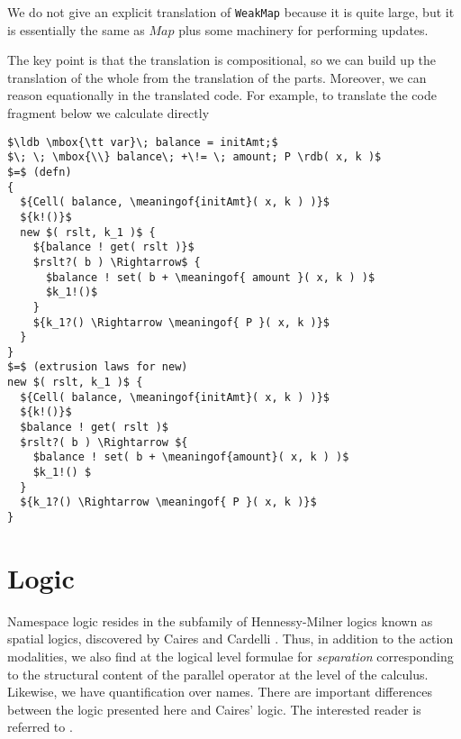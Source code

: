 \documentclass[]{acm_proc_article-sp}
\newcommand{\ldb}{[\![}
\newcommand{\rdb}{]\!]}
\newcommand{\meaningof}[1]{\ldb #1 \rdb}
\numberwithin{equation}{subsection}
\begin{document}
We do not give an explicit translation of {\tt WeakMap} because it is quite
large, but it is essentially the same as $Map$ plus some machinery for performing
updates.



The key point is that the translation is compositional, so we can
build up the translation of the whole from the translation of the
parts. Moreover, we can reason equationally in the translated
code. For example, to translate the code fragment below we calculate
directly


\begin{lstlisting}[mathescape]
$\ldb \mbox{\tt var}\; balance = initAmt;$
$\; \; \mbox{\\} balance\; +\!= \; amount; P \rdb( x, k )$
$=$ (defn)
{ 
  ${Cell( balance, \meaningof{initAmt}( x, k ) )}$
  ${k!()}$
  new $( rslt, k_1 )$ { 
    ${balance ! get( rslt )}$
    $rslt?( b ) \Rightarrow$ {
      $balance ! set( b + \meaningof{ amount }( x, k ) )$
      $k_1!()$
    }
    ${k_1?() \Rightarrow \meaningof{ P }( x, k )}$
  }
}
$=$ (extrusion laws for new)
new $( rslt, k_1 )$ {
  ${Cell( balance, \meaningof{initAmt}( x, k ) )}$
  ${k!()}$
  $balance ! get( rslt )$
  $rslt?( b ) \Rightarrow ${
    $balance ! set( b + \meaningof{amount}( x, k ) )$
    $k_1!() $
  }
  ${k_1?() \Rightarrow \meaningof{ P }( x, k )}$
}
\end{lstlisting}

\section{Logic}
Namespace logic resides in the subfamily of Hennessy-Milner logics
known as spatial logics, discovered by Caires and Cardelli
\cite{DBLP:conf/fossacs/Caires04}. Thus, in addition to the action
modalities, we also find at the logical level formulae for
\emph{separation} corresponding to the structural content of the
parallel operator at the level of the calculus. Likewise, we have
quantification over names. There are important differences between the
logic presented here and Caires' logic. The interested reader is
referred to \cite{DBLP:conf/tgc/MeredithR05}.
\end{document}
